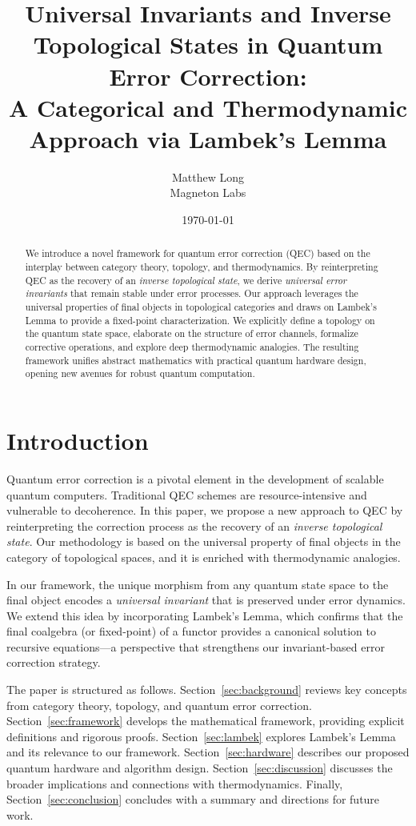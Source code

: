 \documentclass[11pt]{article}
\title{Universal Invariants and Inverse Topological States in Quantum Error Correction:\\ A Categorical and Thermodynamic Approach via Lambek’s Lemma}
\author{Matthew Long \\
Magneton Labs}
\date{\today}
\begin{document}
\maketitle

\begin{abstract}
We introduce a novel framework for quantum error correction (QEC) based on the interplay between category theory, topology, and thermodynamics. By reinterpreting QEC as the recovery of an \emph{inverse topological state}, we derive \emph{universal error invariants} that remain stable under error processes. Our approach leverages the universal properties of final objects in topological categories and draws on Lambek’s Lemma to provide a fixed-point characterization. We explicitly define a topology on the quantum state space, elaborate on the structure of error channels, formalize corrective operations, and explore deep thermodynamic analogies. The resulting framework unifies abstract mathematics with practical quantum hardware design, opening new avenues for robust quantum computation.  
\end{abstract}

\newpage
\tableofcontents
\newpage

\section{Introduction}
Quantum error correction is a pivotal element in the development of scalable quantum computers. Traditional QEC schemes are resource-intensive and vulnerable to decoherence. In this paper, we propose a new approach to QEC by reinterpreting the correction process as the recovery of an \emph{inverse topological state}. Our methodology is based on the universal property of final objects in the category of topological spaces, and it is enriched with thermodynamic analogies. 

In our framework, the unique morphism from any quantum state space to the final object encodes a \emph{universal invariant} that is preserved under error dynamics. We extend this idea by incorporating Lambek’s Lemma, which confirms that the final coalgebra (or fixed-point) of a functor provides a canonical solution to recursive equations—a perspective that strengthens our invariant-based error correction strategy.

The paper is structured as follows. Section~\ref{sec:background} reviews key concepts from category theory, topology, and quantum error correction. Section~\ref{sec:framework} develops the mathematical framework, providing explicit definitions and rigorous proofs. Section~\ref{sec:lambek} explores Lambek’s Lemma and its relevance to our framework. Section~\ref{sec:hardware} describes our proposed quantum hardware and algorithm design. Section~\ref{sec:discussion} discusses the broader implications and connections with thermodynamics. Finally, Section~\ref{sec:conclusion} concludes with a summary and directions for future work.
\end{document}
